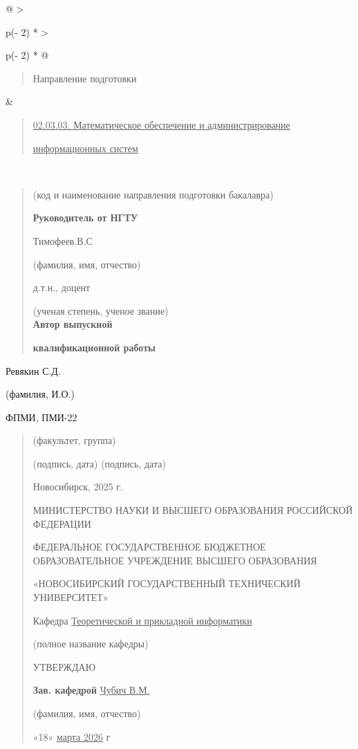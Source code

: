 \documentclass[
]{article}
\begin{document}
\begin{longtable}[]{@{}
  >{\raggedright\arraybackslash}p{(\columnwidth - 2\tabcolsep) * }
  >{\raggedright\arraybackslash}p{(\columnwidth - 2\tabcolsep) * }@{}}
\toprule\noalign{}
\begin{minipage}[b]{\linewidth}\raggedright
\begin{quote}
Направление подготовки
\end{quote}
\end{minipage} & \begin{minipage}[b]{\linewidth}\raggedright
\begin{quote}
\ul{02.03.03. Математическое обеспечение и администрирование}

\ul{информационных систем}
\end{quote}
\end{minipage} \\
\midrule\noalign{}
\endhead
\bottomrule\noalign{}
\endlastfoot
\end{longtable}

\begin{quote}
(код и наименование направления подготовки бакалавра)

\textbf{Руководитель от НГТУ}

Тимофеев.В.С

(фамилия, имя, отчество)

д.т.н., доцент

(ученая степень, ученое звание)\\
\textbf{Автор выпускной}

\textbf{квалификационной работы}
\end{quote}

Ревякин С.Д.

(фамилия, И.О.)

ФПМИ, ПМИ-22

\begin{quote}
(факультет, группа)

(подпись, дата) (подпись, дата)

Новосибирск, 2025 г.

МИНИСТЕРСТВО НАУКИ И ВЫСШЕГО ОБРАЗОВАНИЯ РОССИЙСКОЙ ФЕДЕРАЦИИ

ФЕДЕРАЛЬНОЕ ГОСУДАРСТВЕННОЕ БЮДЖЕТНОЕ ОБРАЗОВАТЕЛЬНОЕ УЧРЕЖДЕНИЕ ВЫСШЕГО
ОБРАЗОВАНИЯ

«НОВОСИБИРСКИЙ ГОСУДАРСТВЕННЫЙ ТЕХНИЧЕСКИЙ УНИВЕРСИТЕТ»

Кафедра \ul{Теоретической и прикладной информатики}

(полное название кафедры)

УТВЕРЖДАЮ

\textbf{Зав. кафедрой} \ul{Чубич В.М.}

(фамилия, имя, отчество)

«18» \ul{марта 2026} г
\end{quote}
\end{document}
